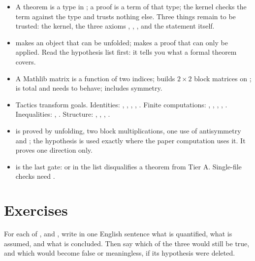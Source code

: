 \begin{summarybox}
\begin{itemize}[leftmargin=*,itemsep=1pt]
\item A theorem is a type in ; a proof is a term of that type; the kernel checks
  the term against the type and trusts nothing else. Three things remain to be trusted: the
  kernel, the three axioms , , , and
  the statement itself.
\item {} makes an object that can be unfolded;  makes a proof that can
  only be applied. Read the hypothesis list first: it tells you what a formal theorem
  covers.
\item A Mathlib matrix is a function of two indices;  builds
  $2\times2$ block matrices on ;  is total and needs
   to behave;  includes symmetry.
\item Tactics transform goals. Identities: , , ,
  , . Finite computations: , ,
  , , . Inequalities: ,
  . Structure: , , ,
  .
\item {} is proved by unfolding, two block multiplications, one use
  of antisymmetry and ; the hypothesis is used exactly where the paper
  computation uses it. It proves one direction only.
\item {} is the last gate:  or 
  in the list disqualifies a theorem from Tier A. Single-file checks need
  .
\end{itemize}
\end{summarybox}

\section*{Exercises}

\begin{exercise}\label{ex:leanprimer:reading}
For each of ,  and ,
write in one English sentence what is quantified, what is assumed, and what is concluded.
Then say which of the three would still be true, and which would become false or
meaningless, if its hypothesis were deleted.
\end{exercise}

